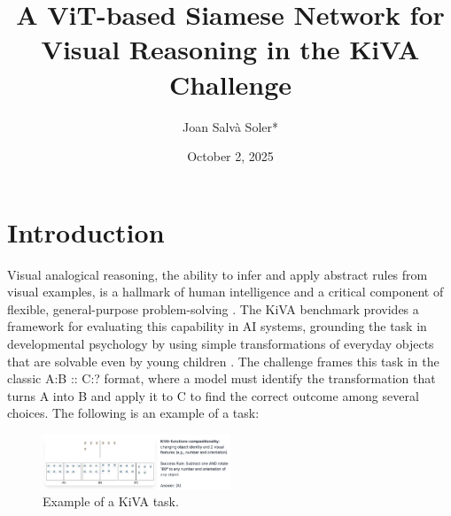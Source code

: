 \documentclass[twocolumn]{article} %
\date{October 2, 2025}
\title{A ViT-based Siamese Network for Visual Reasoning in the KiVA Challenge }
\author[1]{Joan Salvà Soler*\orcidA{}}
\affil[1]{H2O.ai}
\begin{document}



\section{Introduction}

Visual analogical reasoning, the ability to infer and apply abstract rules from visual examples, is a hallmark of human intelligence and a critical component of flexible, general-purpose problem-solving \cite{gentner1983}. The KiVA benchmark provides a framework for evaluating this capability in AI systems, grounding the task in developmental psychology by using simple transformations of everyday objects that are solvable even by young children \cite{yee2025kiva}. The challenge frames this task in the classic A:B :: C:? format, where a model must identify the transformation that turns A into B and apply it to C to find the correct outcome among several choices. The following is an example of a task:

\begin{figure}[h]\vspace{-0.5\baselineskip}
    \centering
    \includegraphics[width=0.5\textwidth]{figures/kiva-example.png}
    \caption{Example of a KiVA task.}
    \label{fig:kiva_example}
\end{figure}\vspace{-0.5\baselineskip}
\end{document}
